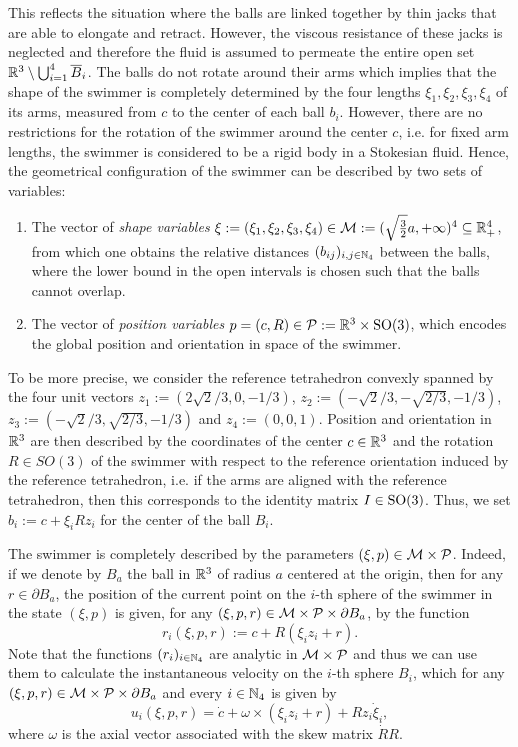  This reflects the situation where the balls are linked together by thin jacks that are able to elongate and retract. However, the viscous resistance of these jacks is neglected and therefore the fluid is assumed to permeate the entire open set $\mathbb{R}^3 \setminus \bigcup_{i = 1}^{4} \overline{B}_i$. The balls do not rotate around their arms which implies that the shape of the swimmer is completely determined by the four lengths $\xi_1, \xi_2, \xi_3, \xi_4$ of its arms, measured from $c$ to the center of each ball $b_i$. However, there are no restrictions for the rotation of the swimmer around the center $c$, i.e. for fixed arm lengths, the swimmer is considered to be a rigid body in a Stokesian fluid.
Hence, the geometrical configuration of the swimmer can be described by two sets of variables:
\begin{enumerate}
	\item The vector of \emph{shape variables} $\xi := (\xi_1, \xi_2, \xi_3, \xi_4) \in \mathcal{M} := (\sqrt{\tfrac{3}{2}}a, +\infty)^4 \subseteq \mathbb{R}_+^4$, from which one obtains the relative distances $(b_{ij})_{i,j \in \mathbb{N}_4}$ between the balls,  where the lower bound in the open intervals is chosen such that the balls cannot overlap.
	\item The vector of \emph{position variables} $p = (c, R) \in \mathcal{P} :=  \mathbb{R}^3 \times \operatorname{SO}(3)$, which encodes the global position and orientation in space of the swimmer.
\end{enumerate}
To be more precise, we consider the reference tetrahedron convexly spanned by the four unit vectors $z_1 := (2 \sqrt{2}/3,0,-1/3)$, $z_2 := (-\sqrt{2}/3,-\sqrt{2/3},-1/3)$, $z_3 := (-\sqrt{2}/3,\sqrt{2/3},-1/3)$ and $z_4 := (0,0,1)$. Position and orientation in $\mathbb{R}^3$ are then described by the coordinates of the center $c \in \mathbb{R}^3$ and the rotation $R \in SO(3)$ of the swimmer with respect to the reference orientation induced by the reference tetrahedron, i.e. if the arms are aligned with the reference tetrahedron, then this corresponds to the identity matrix $I \in \operatorname{SO}(3)$. Thus, we set $b_i := c + \xi_i R z_i$ for the center of the ball $B_i$.

The swimmer is completely described by the parameters $(\xi, p) \in \mathcal{M} \times \mathcal{P}$. Indeed, if we denote by $B_a$ the ball in $\mathbb{R}^3$ of radius $a$ centered at the origin, then for any $r \in \partial B_a$, the position of the current point on the $i$-th sphere of the swimmer in the state $(\xi, p)$ is given, for any $(\xi, p, r) \in \mathcal{M} \times \mathcal{P} \times \partial B_a$, by the function
\begin{equation}
	r_i(\xi, p, r) :=  c + R(\xi_i z_i + r).
\end{equation}
Note that the functions $(r_i)_{i \in \mathbb{N}_4}$ are analytic in $\mathcal{M}  \times \mathcal{P}$ and thus we can use them to calculate the instantaneous velocity on the $i$-th sphere $B_i$, which for any $(\xi, p, r) \in \mathcal{M} \times \mathcal{P} \times \partial B_a$ and every $i \in \mathbb{N}_4$ is given by
\begin{equation}
	u_i(\xi, p, r) = \dot{c} + \omega \times (\xi_i z_i + r) + R z_i \dot{\xi}_i,
\end{equation}
where $\omega$ is the axial vector associated with the skew matrix $\dot{R} R$.

